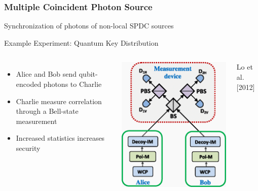 \documentclass{beamer}
\begin{document}
\begin{frame}\frametitle{Multiple Coincident Photon Source}
    Synchronization of photons of non-local SPDC sources 
    \begin{block}{Example Experiment: Quantum Key Distribution}
        \begin{columns}
            \begin{itemize}
                \item Alice and Bob send qubit-encoded photons to Charlie 
                \item Charlie measure correlation through a Bell-state measurement
                \item Increased statistics increases security
            \end{itemize}
            \centering
            \includegraphics[width=1.0\textwidth]{Images/QKD.png}

            \tiny{Lo et al. [2012]}
        \end{columns}
    \end{block}
\end{frame}
\end{document}
